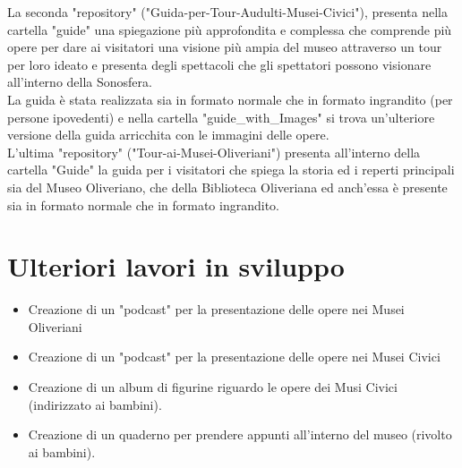 \documentclass[hidelinks,12pt,a4paper]{article}
\begin{document}
\begin{flushleft}
		\bigskip
		La seconda "repository" ("Guida-per-Tour-Audulti-Musei-Civici"), presenta nella cartella "guide" una spiegazione più approfondita e complessa che comprende più opere per dare ai visitatori una visione più ampia del museo attraverso un tour per loro ideato e presenta degli spettacoli che gli spettatori possono visionare all'interno della Sonosfera.\\
		La guida è stata realizzata sia in formato normale che in formato ingrandito (per persone ipovedenti) e nella cartella "guide\_with\_Images" si trova un'ulteriore versione della guida arricchita con le immagini delle opere.\\
		\bigskip
		L'ultima "repository" ("Tour-ai-Musei-Oliveriani") presenta all'interno della cartella "Guide" la guida per i visitatori che spiega la storia ed i reperti principali sia del Museo Oliveriano, che della Biblioteca Oliveriana ed anch'essa è presente sia in formato normale che in formato ingrandito.
		
		\section{Ulteriori lavori in sviluppo}
		
		\begin{itemize}
			\item Creazione di un "podcast" per la presentazione delle opere nei Musei Oliveriani
			\item Creazione di un "podcast" per la presentazione delle opere nei Musei Civici
			\item Creazione di un album di figurine riguardo le opere dei Musi Civici (indirizzato ai bambini).
			\item Creazione di un quaderno per prendere appunti all'interno del museo (rivolto ai bambini).
		\end{itemize}
		
		\vspace*{\fill}
		\doclicenseThis
		
	\end{flushleft}
\end{document}
